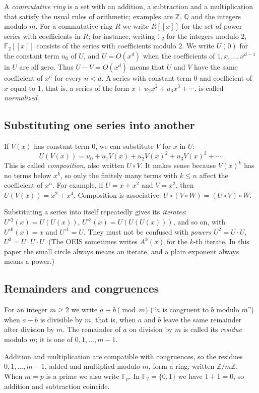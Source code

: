 \documentclass[11pt,a4paper]{article}
\theoremstyle{definition}
\theoremstyle{remark}
\newcommand{\Z}{\mathbb{Z}}
\newcommand{\Q}{\mathbb{Q}}
\newcommand{\F}{\mathbb{F}}
\newcommand{\ps}[1]{#1[[x]]}
\begin{document}
A \emph{commutative ring} is a set with an addition, a subtraction and a multiplication that satisfy the usual rules
of arithmetic; examples are $\Z$, $\Q$ and the integers modulo $m$. For a commutative ring $R$ we write $\ps{R}$ for
the set of power series with coefficients in $R$; for instance, writing $\F_2$ for the integers modulo $2$, $\ps{\F_2}$
consists of the series with coefficients modulo $2$. We write
$U(0)$ for the constant term $u_0$ of $U$, and $U=O(x^d)$ when the coefficients of $1,x,\dots,x^{d-1}$ in $U$ are all
zero. Thus $U-V=O(x^d)$ means that $U$ and $V$ have the same coefficient of $x^n$ for every $n<d$. A series with
constant term $0$ and coefficient of $x$ equal to $1$, that is, a series of the form $x+u_2x^2+u_3x^3+\cdots$, is
called \emph{normalized}.

\subsection{Substituting one series into another}
If $V(x)$ has constant term $0$, we can substitute $V$ for $x$ in $U$:
\[
U(V(x))=u_0+u_1V(x)+u_2V(x)^2+u_3V(x)^3+\cdots .
\]
This is called \emph{composition}, also written $U\circ V$. It makes sense because $V(x)^k$ has no terms below $x^k$,
so only the finitely many terms with $k\le n$ affect the coefficient of $x^n$. For example, if $U=x+x^2$ and $V=x^2$, then
$U(V(x))=x^2+x^4$. Composition is associative: $U\circ(V\circ W)=(U\circ V)\circ W$.

Substituting a series into itself repeatedly gives its \emph{iterates}: $U^{\circ2}(x)=U(U(x))$,
$U^{\circ3}(x)=U(U(U(x)))$, and so on, with $U^{\circ0}(x)=x$ and $U^{\circ1}=U$. They must not be confused with
\emph{powers} $U^2=U\cdot U$, $U^3=U\cdot U\cdot U$. (The OEIS sometimes writes $A^k(x)$ for the $k$-th iterate. In
this paper the small circle always means an iterate, and a plain exponent always means a power.)

\subsection{Remainders and congruences}
For an integer $m\ge2$ we write $a\equiv b\pmod m$ (``$a$ is congruent to $b$ modulo $m$'') when $a-b$ is divisible by
$m$, that is, when $a$ and $b$ leave the same remainder after division by $m$. The remainder of $a$ on division by
$m$ is called its \emph{residue} modulo $m$; it is one of $0,1,\dots,m-1$.

Addition and multiplication are compatible with congruences, so the residues $0,1,\dots,m-1$, added and multiplied
modulo $m$, form a ring, written $\Z/m\Z$. When $m=p$ is a prime we also write $\F_p$. In $\F_2=\{0,1\}$ we have $1+1=0$,
so addition and subtraction coincide.
\end{document}

